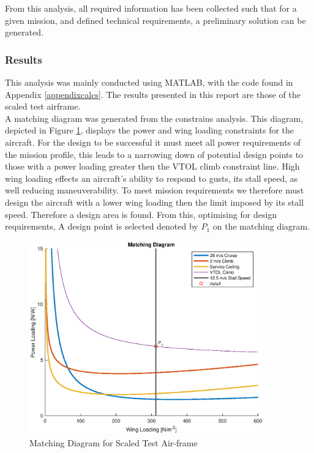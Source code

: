From this analysis, all required information has been collected such that for a given mission, and defined technical requirements, a preliminary solution can be generated. 
\subsubsection{Results}
This analysis was mainly conducted using MATLAB, with the code found in Appendix \ref{appendixcalcs}. The results presented in this report are those of the scaled test airframe. \\

A matching diagram was generated from the constrains analysis. This diagram, depicted in Figure \ref{fig:matchingdaig}, displays the power and wing loading constraints for the aircraft. For the design to be successful it must meet all power requirements of the mission profile, this leads to a narrowing down of potential design points to those with a power loading greater then the VTOL climb constraint line. High wing loading effects an aircraft's ability to respond to gusts, its stall speed, as well reducing maneuverability. To meet mission requirements we therefore must design the aircraft with a lower wing loading then the limit imposed by its stall speed. Therefore a design area is found. From this, optimising for design requirements, A design point is selected denoted by $P_1$ on the matching diagram.

\begin{figure}[H]
    \centering
    \includegraphics[width = 0.9\textwidth]{PrelimSizing/matching1.eps}
    \caption{Matching Diagram for Scaled Test Air-frame}
    \label{fig:matchingdaig}
\end{figure}

